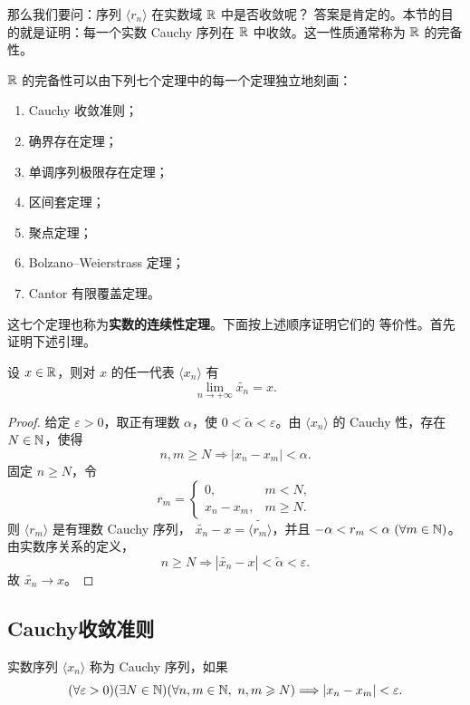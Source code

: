 那么我们要问：序列 \(\langle r_n\rangle\) 在实数域 \(\mathbb{R}\) 中是否收敛呢？
答案是肯定的。本节的目的就是证明：每一个实数 Cauchy 序列在 \(\mathbb{R}\)
中收敛。这一性质通常称为 \(\mathbb{R}\) 的完备性。

\(\mathbb{R}\) 的完备性可以由下列七个定理中的每一个定理独立地刻画：
\begin{enumerate}[label=\arabic*)]
  \item Cauchy 收敛准则；
  \item 确界存在定理；
  \item 单调序列极限存在定理；
  \item 区间套定理；
  \item 聚点定理；
  \item Bolzano--Weierstrass 定理；
  \item Cantor 有限覆盖定理。
\end{enumerate}

这七个定理也称为\textbf{实数的连续性定理}。下面按上述顺序证明它们的
等价性。首先证明下述引理。

\begin{mylemma*}{}
设 \(x\in\mathbb{R}\)，则对 \(x\) 的任一代表 \(\langle x_n\rangle\) 有
\[
\lim_{n\to+\infty}\widetilde{x_n}=x.
\]
\end{mylemma*}

\begin{proof}
给定 \(\varepsilon>0\)，取正有理数 \(\alpha\)，使
\(0<\widetilde\alpha<\varepsilon\)。由 \(\langle x_n\rangle\) 的
Cauchy 性，存在 \(N\in\mathbb{N}\)，使得
\[
n,m\geqslant N\Longrightarrow |x_n-x_m|<\alpha.
\]
固定 \(n\geqslant N\)，令
\[
r_m=\begin{cases}
0,&m<N,\\
x_n-x_m,&m\geqslant N.
\end{cases}
\]
则 \(\langle r_m\rangle\) 是有理数 Cauchy 序列，
\(\widetilde{x_n}-x=\widetilde{\langle r_m\rangle}\)，并且
\(-\alpha<r_m<\alpha\ (\forall m\in\mathbb{N})\)。由实数序关系的定义，
\[
n\geqslant N\Longrightarrow
|\widetilde{x_n}-x|<\widetilde\alpha<\varepsilon.
\]
故 \(\widetilde{x_n}\to x\)。
\end{proof}

\subsection{Cauchy收敛准则}

\begin{mydef*}{}
实数序列 \(\langle x_n\rangle\) 称为 Cauchy 序列，如果
\[
(\forall\varepsilon>0)(\exists N\in\mathbb{N})
(\forall n,m\in\mathbb{N},\ n,m\geqslant N)
\Longrightarrow |x_n-x_m|<\varepsilon.
\]
\end{mydef*}


